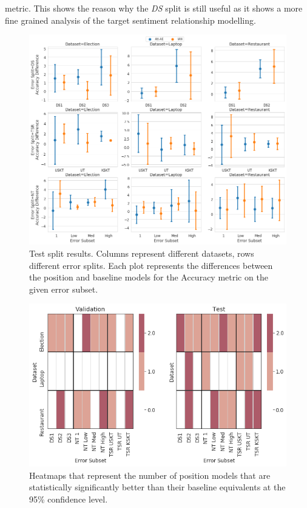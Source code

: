 metric. This shows the reason why the \textit{DS} split is still useful as it shows a more fine grained analysis of the target sentiment relationship modelling. 

\begin{figure}[h!]
    \centering
    \includegraphics[scale=0.32]{images/augmentation/methods_performance/Position_Encoding/position_split_difference_test_results.png}
    \caption{Test split results. Columns represent different datasets, rows different error splits. Each plot represents the differences between the position and baseline models for the Accuracy metric on the given error subset.}
    \label{fig:aug_position_split_difference_test_results}
\end{figure}

\begin{figure}[h!]
    \centering
    \includegraphics[scale=0.5]{images/augmentation/methods_performance/Position_Encoding/position_dataset_subset_heatmap.png}
    \caption{Heatmaps that represent the number of position models that are statistically significantly better than their baseline equivalents at the 95\% confidence level.}
    \label{fig:aug_position_dataset_subset_heatmap}
\end{figure}

